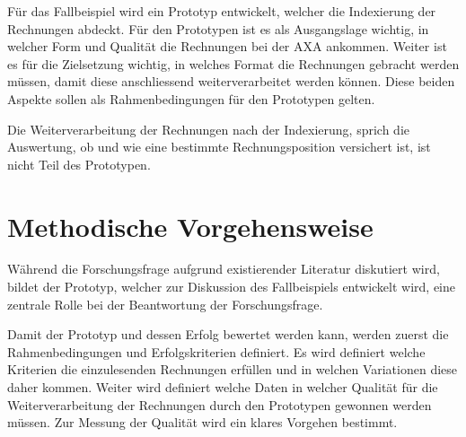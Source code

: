\documentclass[12pt, twoside, table]{extarticle}
\begin{document}
Für das Fallbeispiel wird ein Prototyp entwickelt, welcher die Indexierung der Rechnungen abdeckt. Für den Prototypen ist es als Ausgangslage wichtig, in welcher Form und Qualität die Rechnungen bei der AXA ankommen. Weiter ist es für die Zielsetzung wichtig, in welches Format die Rechnungen gebracht werden müssen, damit diese anschliessend weiterverarbeitet werden können. Diese beiden Aspekte sollen als Rahmenbedingungen für den Prototypen gelten.

Die Weiterverarbeitung der Rechnungen nach der Indexierung, sprich die Auswertung, ob und wie eine bestimmte Rechnungsposition versichert ist, ist nicht Teil des Prototypen.


\newpage
\section{Methodische Vorgehensweise}


Während die Forschungsfrage aufgrund existierender Literatur diskutiert wird, bildet der Prototyp, welcher zur Diskussion des Fallbeispiels entwickelt wird, eine zentrale Rolle bei der Beantwortung der Forschungsfrage.

Damit der Prototyp und dessen Erfolg bewertet werden kann, werden zuerst die Rahmenbedingungen und Erfolgskriterien definiert. Es wird definiert welche Kriterien die einzulesenden Rechnungen erfüllen und in welchen Variationen diese daher kommen. Weiter wird definiert welche Daten in welcher Qualität für die Weiterverarbeitung der Rechnungen durch den Prototypen gewonnen werden müssen. Zur Messung der Qualität wird ein klares Vorgehen bestimmt.
\end{document}
